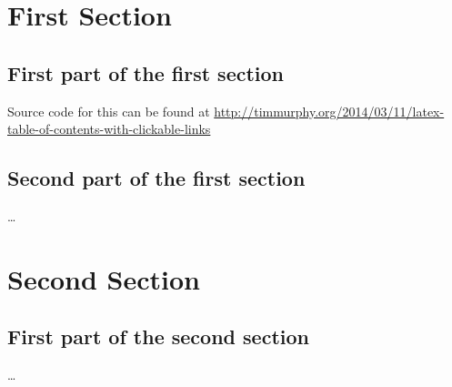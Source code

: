 \documentclass[12pt, a4paper]{article}
\begin{document}
\tableofcontents
\newpage

\section{First Section}
\subsection{First part of the first section}
Source code for this can be found at \url{http://timmurphy.org/2014/03/11/latex-table-of-contents-with-clickable-links}
\subsection{Second part of the first section}
\ldots

\section{Second Section}
\subsection{First part of the second section}
\ldots
\end{document}
